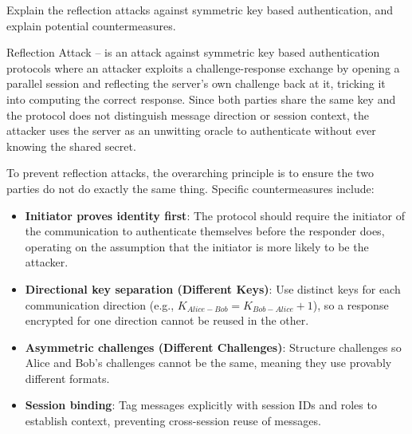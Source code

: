 \item[\textbf{Problem 5}]
Explain the reflection attacks against symmetric key based authentication, and
explain potential countermeasures.

\Solution

Reflection Attack -- is an attack against symmetric key based authentication
protocols where an attacker exploits a challenge-response exchange by opening a
parallel session and reflecting the server's own challenge back at it, tricking
it into computing the correct response. Since both parties share the same key
and the protocol does not distinguish message direction or session context, the
attacker uses the server as an unwitting oracle to authenticate without ever
knowing the shared secret.

To prevent reflection attacks, the overarching principle is to ensure the two
parties do not do exactly the same thing. Specific countermeasures include:
\begin{itemize}
    \item \textbf{Initiator proves identity first}: The protocol should require
    the initiator of the communication to authenticate themselves before the
    responder does, operating on the assumption that the initiator is more
    likely to be the attacker.
    
    \item \textbf{Directional key separation (Different Keys)}: Use distinct
    keys for each communication direction (e.g., $K_{Alice-Bob} = K_{Bob-Alice}
    + 1$), so a response encrypted for one direction cannot be reused in the
    other.
    
    \item \textbf{Asymmetric challenges (Different Challenges)}: Structure
    challenges so Alice and Bob's challenges cannot be the same, meaning they
    use provably different formats.
    
    \item \textbf{Session binding}: Tag messages explicitly with session IDs and
    roles to establish context, preventing cross-session reuse of messages.
\end{itemize}
